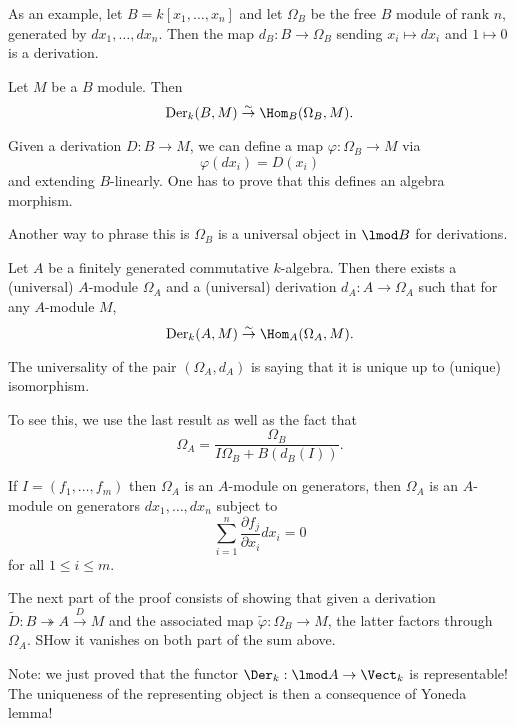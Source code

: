 \documentclass[12pt]{article}
\begin{document}
As an example, let $B=k[x_1,\dots,x_n]$ and let $\Omega_B$ be the free $B$ module of rank $n$, generated by $dx_1,\dots,dx_n$.
Then the map $d_B:B\to\Omega_B$ sending $x_i\mapsto dx_i$ and $1\mapsto 0$ is a derivation.
\begin{lem}
	Let $M$ be a $B$ module. Then 
	\[\operatorname{Der}_k(B,M)\stackrel{\sim}{\to}\Hom_B(\Omega_B,M).\]
\end{lem}
\begin{prf}
	Given a derivation $D:B\to M$, we can define a map $\varphi:\Omega_B\to M$ via 
	\[\varphi(dx_i)=D(x_i)\]
	and extending $B$-linearly. One has to prove that this defines an algebra morphism. 
\end{prf}
\begin{rmk}
	Another way to phrase this is $\Omega_B$ is a universal object in $\lmod B$ for derivations.
\end{rmk}
\begin{thm}
	Let $A$ be a finitely generated commutative $k$-algebra. Then there exists a (universal) $A$-module $\Omega_A$
	and a (universal) derivation $d_A:A\to \Omega_A$ such that for any $A$-module $M$,
	\[\operatorname{Der}_k(A,M)\stackrel{\sim}{\to}\Hom_A(\Omega_A,M).\]
\end{thm}
\begin{rmk}
	The universality of the pair $(\Omega_A,d_A)$ is saying that it is unique up to (unique) isomorphism.
\end{rmk}
\begin{prf}
	To see this, we use the last result as well as the fact that 
	\[\Omega_A=\frac{\Omega_B}{I\Omega_B+B(d_B(I))}.\]

	If $I=(f_1,\dots,f_m)$ then $\Omega_A$ is an $A$-module on generators, then $\Omega_A$ is an $A$-module on generators 
	$dx_1,\dots,dx_n$ subject to 
	\[\sum_{i=1}^n\frac{\partial f_j}{\partial x_i}dx_i=0\]
	for all $1\le i\le m$.

	The next part of the proof consists of showing that given a derivation $\tilde D:B\twoheadrightarrow A\xrightarrow{D}M$ and the associated map $\tilde\varphi:\Omega_B\to M$, 
	the latter factors through $\Omega_A$. SHow it vanishes on both part of the sum above.
\end{prf}
\begin{rmk}
	Note: we just proved that the functor $\Der_k:\lmod A\to\Vect_k$ is representable! The uniqueness of the representing object is then a consequence of Yoneda lemma!
\end{rmk}
\end{document}
